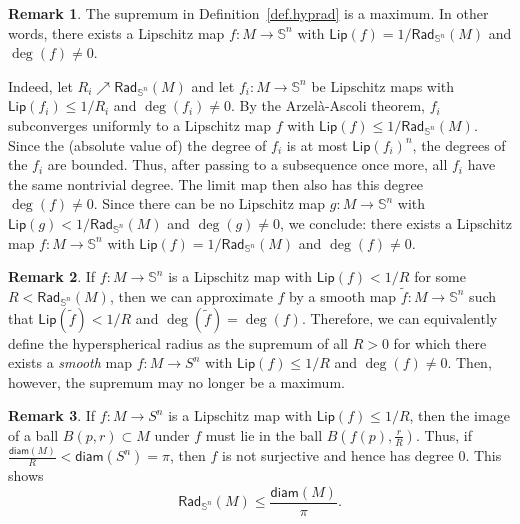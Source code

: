 \documentclass[11pt,reqno]{amsart}
\newcommand{\RadSn}{\mathsf{Rad}_{\Sn}}
\newcommand{\diam}{\mathsf{diam}}
\newcommand{\Lip}{\mathsf{Lip}}
\newcommand{\Sn}{\mathbb{S}^n}
\newcommand{\<}{\langle}
\renewcommand{\>}{\rangle}
\theoremstyle{definition}
\newtheorem{remark}{Remark}
\begin{document}
\begin{remark}
The supremum in Definition~\ref{def.hyprad} is a maximum.
In other words, there exists a Lipschitz map $f\colon M\to \Sn$ with $\Lip(f)= 1/\RadSn(M)$ and $\deg(f)\neq0$.

Indeed, let $R_i\nearrow \RadSn(M)$ and let $f_i\colon M\to \Sn$ be Lipschitz maps with $\Lip(f_i)\le 1/R_i$ and $\deg(f_i)\neq0$.
By the Arzelà-Ascoli theorem, $f_i$ subconverges uniformly to a Lipschitz map $f$ with $\Lip(f)\le 1/\RadSn(M)$.
Since the (absolute value of) the degree of $f_i$ is at most $\Lip(f_i)^n$, the degrees of the $f_i$ are bounded.
Thus, after passing to a subsequence once more, all $f_i$ have the same nontrivial degree.
The limit map then also has this degree $\deg(f)\ne0$.
Since there can be no Lipschitz map $g\colon M\to \Sn$ with $\Lip(g)<1/\RadSn(M)$ and $\deg(g)\neq0$, we conclude:
there exists a Lipschitz map $f\colon M\to \Sn$ with $\Lip(f)=1/\RadSn(M)$ and $\deg(f)\neq0$.
\end{remark}

\begin{remark}
If $f\colon M\to\Sn$ is a Lipschitz map with $\Lip(f)<1/R$ for some $R<\RadSn(M)$, then we can approximate $f$ by a smooth map $\tilde{f}\colon M\to \Sn$ such that $\Lip(\tilde{f})<1/R$ and $\deg(\tilde{f})=\deg(f)$.
Therefore, we can equivalently define the hyperspherical radius as the supremum of all $R>0$ for which there exists a \emph{smooth} map $f\colon M\to S^n$ with $\Lip(f)\le 1/R$ and $\deg(f)\ne0$.
Then, however, the supremum may no longer be a maximum.
\end{remark}

\begin{remark}\label{rem.raddiam}
If $f\colon M\to S^n$ is a Lipschitz map with $\Lip(f)\le 1/R$, then the image of a ball $B(p,r)\subset M$ under $f$ must lie in the ball $B(f(p),\frac{r}{R})$.
Thus, if $\frac{\diam(M)}{R}< \diam(S^n) = \pi$, then $f$ is not surjective and hence has degree $0$.
This shows 
$$
\RadSn(M)\le \frac{\diam(M)}{\pi}.
$$
\end{remark}
\end{document}
